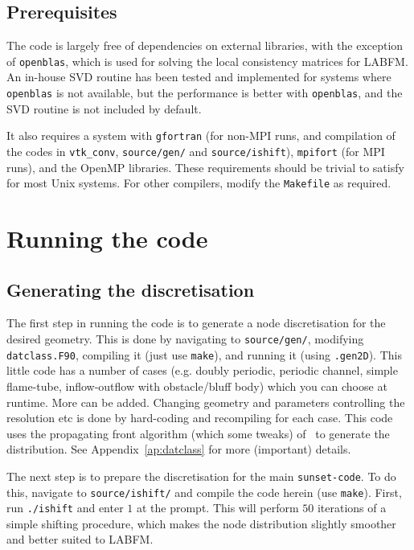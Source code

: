 \documentclass[notitlepage]{revtex4-1}
\begin{document}
\subsection{Prerequisites}

The code is largely free of dependencies on external libraries, with the exception of \verb|openblas|, which is used for solving the local consistency matrices for LABFM. An in-house SVD routine has been tested and implemented for systems where \verb|openblas| is not available, but the performance is better with \verb|openblas|, and the SVD routine is not included by default.

It also requires a system with \verb|gfortran| (for non-MPI runs, and compilation of the codes in \verb|vtk_conv|, \verb|source/gen/| and \verb|source/ishift|), \verb|mpifort| (for MPI runs), and the OpenMP libraries. These requirements should be trivial to satisfy for most Unix systems. For other compilers, modify the \verb|Makefile| as required.

\section{Running the code}

\subsection{Generating the discretisation}

The first step in running the code is to generate a node discretisation for the desired geometry. This is done by navigating to \verb|source/gen/|, modifying \verb|datclass.F90|, compiling it (just use \verb|make|), and running it (using \verb|.gen2D|). This little code has a number of cases (e.g. doubly periodic, periodic channel, simple flame-tube, inflow-outflow with obstacle/bluff body) which you can choose at runtime. More can be added. Changing geometry and parameters controlling the resolution etc is done by hard-coding and recompiling for each case. This code uses the propagating front algorithm (which some tweaks) of~\cite{fornberg_2015a} to generate the distribution. See Appendix~\ref{ap:datclass} for more (important) details.


The next step is to prepare the discretisation for the main \verb|sunset-code|. To do this, navigate to \verb|source/ishift/| and compile the code herein (use \verb|make|). First, run \verb|./ishift| and enter $1$ at the prompt. This will perform $50$ iterations of a simple shifting procedure, which makes the node distribution slightly smoother and better suited to LABFM.
\end{document}
